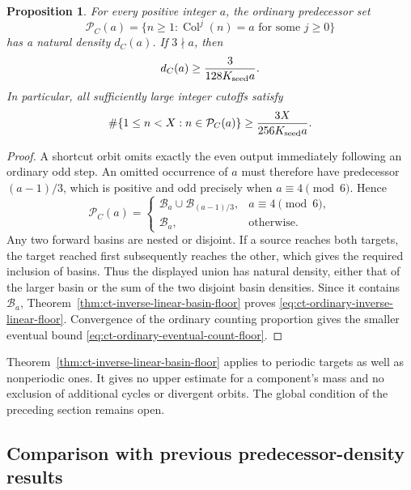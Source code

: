 \documentclass[11pt,a4paper]{article}
\newtheorem{proposition}[theorem]{Proposition}
\begin{document}
\begin{proposition}\label{prop:ct-ordinary-inverse-linear-floor}
For every positive integer \(a\), the ordinary predecessor set
\[
 \mathcal P_C(a)=\{n\ge1:\operatorname{Col}^j(n)=a
                         \text{ for some }j\ge0\}
\]
has a natural density \(d_C(a)\). If \(3\nmid a\), then
\begin{equation}\label{eq:ct-ordinary-inverse-linear-floor}
 d_C(a)\ge\frac{3}{128K_{\rm seed}a}.
\end{equation}
In particular, all sufficiently large integer cutoffs satisfy
\begin{equation}\label{eq:ct-ordinary-eventual-count-floor}
 \#\{1\le n<X:n\in\mathcal P_C(a)\}
        \ge\frac{3X}{256K_{\rm seed}a}.
\end{equation}
\end{proposition}
\begin{proof}
A shortcut orbit omits exactly the even output immediately following
an ordinary odd step. An omitted occurrence of \(a\) must therefore
have predecessor \((a-1)/3\), which is positive and odd precisely
when \(a\equiv4\pmod6\). Hence
\[
 \mathcal P_C(a)=
 \begin{cases}
 \mathcal B_a\cup\mathcal B_{(a-1)/3},&a\equiv4\pmod6,\\
 \mathcal B_a,&\text{otherwise}.
 \end{cases}
\]
Any two forward basins are nested or disjoint. If a source reaches
both targets, the target reached first subsequently reaches the other,
which gives the required inclusion of basins. Thus the displayed
union has natural density, either that of the larger basin or the
sum of the two disjoint basin densities. Since it contains
\(\mathcal B_a\), Theorem~\ref{thm:ct-inverse-linear-basin-floor}
proves \eqref{eq:ct-ordinary-inverse-linear-floor}. Convergence of
the ordinary counting proportion gives the smaller eventual bound
\eqref{eq:ct-ordinary-eventual-count-floor}.
\end{proof}

Theorem~\ref{thm:ct-inverse-linear-basin-floor} applies to periodic
targets as well as nonperiodic ones. It gives no upper estimate for
a component's mass and no exclusion of additional cycles or divergent
orbits. The global condition of the preceding section remains open.

\subsection{Comparison with previous predecessor-density results}
\end{document}
